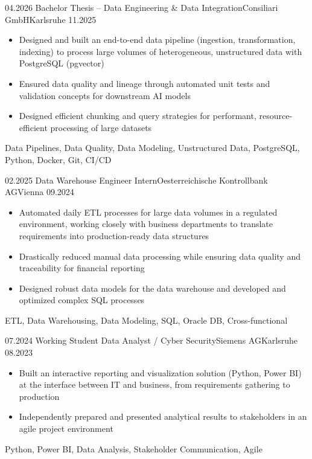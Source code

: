 \begin{experiences}
\experience
{04.2026} {Bachelor Thesis -- Data Engineering \& Data Integration}{Consiliari GmbH}{Karlsruhe}
{11.2025} {
\begin{itemize}
\item Designed and built an end-to-end data pipeline (ingestion, transformation, indexing) to process large volumes of heterogeneous, unstructured data with PostgreSQL (pgvector)
\item Ensured data quality and lineage through automated unit tests and validation concepts for downstream AI models
\item Designed efficient chunking and query strategies for performant, resource-efficient processing of large datasets
\end{itemize}
}
{Data Pipelines, Data Quality, Data Modeling, Unstructured Data, PostgreSQL, Python, Docker, Git, CI/CD}
\emptySeparator

\experience
{02.2025} {Data Warehouse Engineer Intern}{Oesterreichische Kontrollbank AG}{Vienna}
{09.2024} {
\begin{itemize}
\item Automated daily ETL processes for large data volumes in a regulated environment, working closely with business departments to translate requirements into production-ready data structures
\item Drastically reduced manual data processing while ensuring data quality and traceability for financial reporting
\item Designed robust data models for the data warehouse and developed and optimized complex SQL processes
\end{itemize}
}
{ETL, Data Warehousing, Data Modeling, SQL, Oracle DB, Cross-functional}
\emptySeparator

\experience
{07.2024} {Working Student Data Analyst / Cyber Security}{Siemens AG}{Karlsruhe}
{08.2023} {
\begin{itemize}
\item Built an interactive reporting and visualization solution (Python, Power BI) at the interface between IT and business, from requirements gathering to production
\item Independently prepared and presented analytical results to stakeholders in an agile project environment
\end{itemize}
}
{Python, Power BI, Data Analysis, Stakeholder Communication, Agile}
\end{experiences}